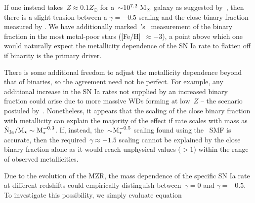 \documentclass[foo.tex]{subfiles}
\begin{document}
If one instead takes~$Z \approx 0.1Z_\odot$ for a~$\sim$$10^{7.2}~\text{M}_\odot$ galaxy
as suggested by~\citet{Andrews2013}, then there is a slight tension between a
$\gamma = -0.5$ scaling and the close binary fraction measured by
\citet{Moe2019}.
{\color{red}
We have additionally marked~\citeauthor{Moe2019}'s~\citeyearpar{Moe2019}
measurement of the binary fraction in the most metal-poor stars
([Fe/H]~$\approx -3$), a point above which one would naturally expect the
metallicity dependence of the SN Ia rate to flatten off if binarity is the
primary driver.
}
\par
There is some additional freedom to adjust the metallicity dependence beyond
that of binaries, so the agreement need not be perfect.
For example, any additional increase in the SN Ia rates not supplied by an
increased binary fraction could arise due to more massive WDs forming at
low~$Z$ -- the scenario postuled by~\citet{Kistler2013}.
Nonetheless, it appears that the scaling of the close binary fraction with
metallicity can explain the majority of the effect if rate scales with mass as
$\dot{\text{N}}_\text{Ia} / \text{M}_\star \sim \text{M}_\star^{-0.3}$.
If, instead, the~$\sim$$\text{M}_\star^{-0.5}$ scaling found using the~\citet{Bell2003}
SMF is accurate, then the required~$\gamma \approx -1.5$ scaling cannot be
explained by the close binary fraction alone as it would reach unphysical
values ($>1$) within the range of observed metallicities.
\par
Due to the evolution of the MZR, the mass dependence of the specific SN Ia rate
at different redshifts could empirically distinguish between~$\gamma = 0$ and
$\gamma = -0.5$.
To investigate this possibility, we simply evaluate equation~
\end{document}
